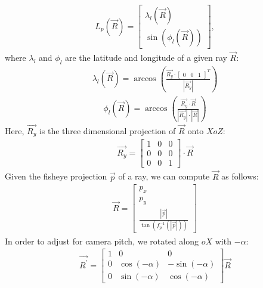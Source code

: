 \documentclass[10pt,twocolumn,letterpaper]{article}
\begin{document}
\begin{equation}
\begin{aligned}
L_{p}(\vec{R}) = \left[ \begin{array}{c} \lambda_{l}(\vec{R}) \\ \sin(\phi_{l}(\vec{R})) \end{array}\right],
\end{aligned}
\end{equation}
where $ \lambda_{l} $ and $ \phi_{l} $ are the latitude and longitude of a given ray $ \vec{R} $: 
\begin{equation}
\begin{aligned}
\lambda_{l}(\vec{R}) = \arccos(\frac{\vec{R_{y}} \cdot \left[\begin{array}{ccc}0 & 0 & 1\end{array} \right]^{T}}{|\vec{R_{y}}|})
\end{aligned}
\end{equation}
\begin{equation}
\begin{aligned}
\phi_{l}(\vec{R}) = \arccos(\frac{\vec{R_{y}} \cdot \vec{R}}{|\vec{R_{y}}| \cdot |\vec{R}|})
\end{aligned}
\end{equation}
Here, $ \vec{R_{y}} $ is the three dimensional projection of $ \vec{R} $ onto $ XoZ $:
\begin{equation}
\begin{aligned}
\vec{R_{y}} = \left[ \begin{array}{ccc} 1 & 0 & 0 \\ 0 & 0 & 0 \\ 0 & 0 & 1 \end{array} \right] \cdot \vec{R}
\end{aligned}
\end{equation}
Given the fisheye projection $ \vec{p} $ of a ray, we can compute $ \vec{R} $ as follows: 
\begin{equation}
\begin{aligned}
\vec{R} = \left[ \begin{array}{c} p_{x} \\ p_{y} \\ \frac{|\vec{p}|}{\tan(f_{p}^{-1}(|\vec{p}|))} \end{array} \right]
\end{aligned}
\end{equation}
In order to adjust for camera pitch, we rotated along $ oX $ with $ -\alpha $:
\begin{equation}
\begin{aligned}
\vec{R^{'}} = \left[ \begin{array}{ccc} 1 & 0 & 0 \\ 0 & \cos(-\alpha) & -\sin(-\alpha) \\ 0 & \sin(-\alpha) & \cos(-\alpha) \end{array} \right] \vec{R}
\end{aligned}
\end{equation}
\end{document}
